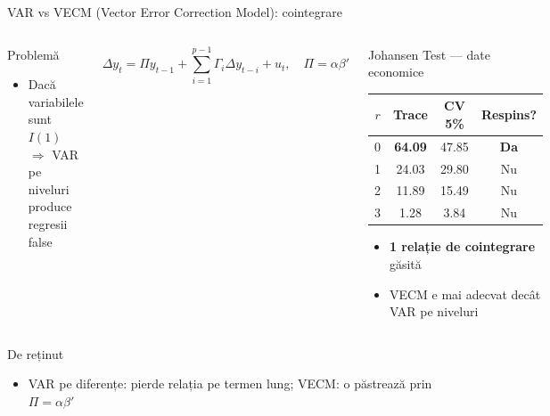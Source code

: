 \documentclass[9pt, aspectratio=169, t]{beamer}
\begin{document}
\begin{frame}{VAR vs VECM (Vector Error Correction Model): cointegrare}
    \vspace{-0.2cm}
    \begin{columns}[T]
        \begin{block}{Problemă}
            \begin{itemize}\setlength{\itemsep}{0pt}
                \item Dacă variabilele sunt $I(1)$ $\Rightarrow$ VAR pe niveluri produce regresii false
            \end{itemize}
        \end{block}
        \vspace{-0.15cm}
        \begin{defn}[VECM]
            \vspace{-0.3cm}
            \[
            \Delta y_t = \Pi y_{t-1} + \sum_{i=1}^{p-1} \Gamma_i \Delta y_{t-i} + u_t, \quad \Pi = \alpha \beta'
            \]
        \end{defn}

        \begin{exampleblock}{Johansen Test --- date economice}
            {\footnotesize
            \begin{tabular}{cccc}
                $r$ & Trace & CV 5\% & Respins? \\
                \midrule
                0 & \textbf{64.09} & 47.85 & \textbf{Da} \\
                1 & 24.03 & 29.80 & Nu \\
                2 & 11.89 & 15.49 & Nu \\
                3 & 1.28 & 3.84 & Nu \\
            \end{tabular}
            }
            \vspace{0.1cm}
            \begin{itemize}\setlength{\itemsep}{0pt}
                \item \textbf{1 relație de cointegrare} găsită
                \item VECM e mai adecvat decât VAR pe niveluri
            \end{itemize}
        \end{exampleblock}
    \end{columns}

    \vspace{0.1cm}

    \begin{alertblock}{De reținut}
        \begin{itemize}\setlength{\itemsep}{0pt}
            \item VAR pe diferențe: pierde relația pe termen lung; VECM: o păstrează prin $\Pi = \alpha \beta'$
        \end{itemize}
    \end{alertblock}
\end{frame}
\end{document}

